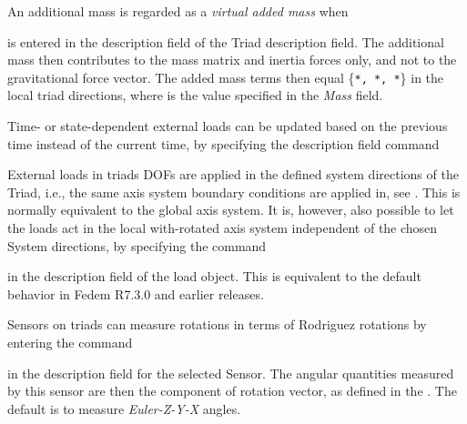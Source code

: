 \clearpage
An additional mass is regarded as a {\sl virtual added mass} when


\noindent
is entered in the description field of the Triad description field.
The additional mass then contributes to the mass matrix and inertia forces only,
and not to the gravitational force vector. The added mass terms then equal
\{{\tt{}*, *,
*}\} in the local triad directions,
where {\tt{}} is the value specified in the {\sl Mass} field.



Time- or state-dependent external loads can be updated based on the previous
time instead of the current time, by specifying the description field command


External loads in triads DOFs are applied in the defined system directions
of the Triad, i.e., the same axis system boundary conditions are applied in,
see .
This is normally equivalent to the global axis system. It is, however,
also possible to let the loads act in the local with-rotated axis system
independent of the chosen System directions, by specifying the command


\noindent
in the description field of the load object. This is equivalent to the
default behavior in Fedem R7.3.0 and earlier releases.




Sensors on triads can measure rotations in terms of Rodriguez rotations
by entering the command


\noindent
in the description field for the selected Sensor. The angular quantities
measured by this sensor are then the component of rotation vector, as defined in
the .
The default is to measure {\sl Euler-Z-Y-X} angles.

